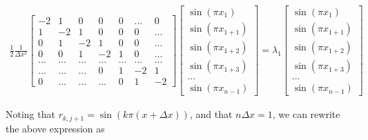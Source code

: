 \documentclass{article}
\begin{document}
	\begin{align*}
	 \frac{1}{2}\frac{1}{\Delta x^{2}}\begin{bmatrix}
	-2 & 1 & 0 & 0 & 0 & ... & 0\\
	1 & -2 & 1 & 0 & 0 & 0 & ...\\
	0 & 1 & -2 & 1 & 0 & 0 & ... \\
	0 & 0 & 1 & -2 & 1 & 0 & ... \\
	... & ... & ... & ... & ... & ... & ... \\
	... & ... & ... & 0 & 1 & -2 & 1 \\
	0 & ... & ... & ... & 0 & 1 & -2 
	\end{bmatrix}
	\begin{bmatrix}
	\sin(\pi x_{1}) \\
	\sin(\pi x_{1+1})\\
	\sin(\pi x_{1+2})\\
	\sin(\pi x_{1+3})\\
	...\\
	\sin(\pi x_{n-1})
	\end{bmatrix}=\lambda_{1}
	\begin{bmatrix}
	\sin(\pi x_{1}) \\
	\sin(\pi x_{1+1})\\
	\sin(\pi x_{1+2})\\
	\sin(\pi x_{1+3})\\
	...\\
	\sin(\pi x_{n-1})
	\end{bmatrix}
	\end{align*}
	
	Noting that $r_{k,j+1}=\sin(k\pi(x+\Delta x))$, and that $n\Delta x=1$, we can rewrite the above expression as 
	
\end{document}

